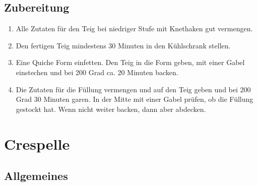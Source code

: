\subsection*{Zubereitung}
\begin{enumerate}
    \item Alle Zutaten für den Teig bei niedriger Stufe mit Knethaken gut vermengen. 
    \item Den fertigen Teig mindestens 30 Minuten in den Kühlschrank stellen.
    \item Eine Quiche Form einfetten. Den Teig in die Form geben, mit einer Gabel einstechen und bei 200 Grad ca. 20 Minuten backen.
    \item Die Zutaten für die Füllung vermengen und auf den Teig geben und bei 200 Grad 30 Minuten garen. In der Mitte mit einer Gabel prüfen, ob die Füllung gestockt hat. Wenn nicht weiter backen, dann aber abdecken.
\end{enumerate}

\section{Crespelle} \label{sec:Crespelle}
\subsection*{Allgemeines}

